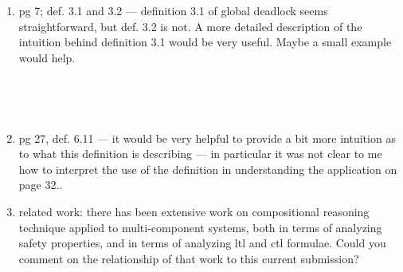 \begin{enumerate}
\item pg 7; def. 3.1 and 3.2 --- definition 3.1 of global deadlock seems straightforward, but
def. 3.2 is not.  A more detailed description of the intuition behind definition 3.1 would
be very useful.  Maybe a small example would help.

~


~

\item pg 27, def. 6.11 --- it would be very helpful to provide a bit more
intuition as to what this definition is describing --- in particular it was not
clear to me how to interpret the use of the definition in understanding the
application on page 32..


\item  related work: there has been extensive work on compositional reasoning
technique applied to multi-component systems, both in terms of analyzing
safety properties, and in terms of analyzing ltl and ctl formulae. 
Could you comment
on the relationship of that work to this current submission?


\end{enumerate}



